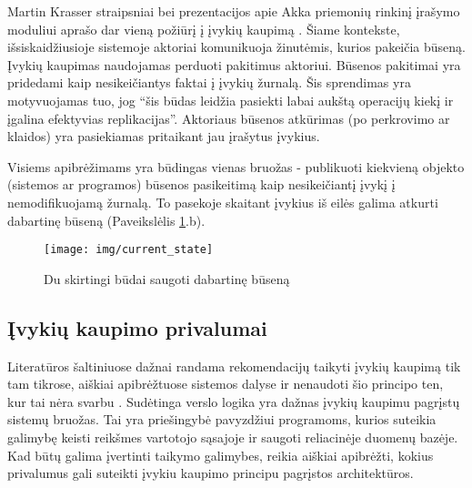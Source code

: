 Martin Krasser straipsniai bei prezentacijos apie Akka priemonių rinkinį įrašymo moduliui aprašo dar vieną požiūrį į įvykių kaupimą \cite{Krasser:AkkaPersistence, Krasser:AkkaYoutube}. Šiame kontekste, išsiskaidžiusioje sistemoje aktoriai komunikuoja žinutėmis, kurios pakeičia būseną. Įvykių kaupimas naudojamas perduoti pakitimus aktoriui. Būsenos pakitimai yra pridedami kaip nesikeičiantys faktai į įvykių žurnalą. Šis sprendimas yra motyvuojamas tuo, jog “šis būdas leidžia pasiekti labai aukštą operacijų kiekį ir įgalina efektyvias replikacijas”. Aktoriaus būsenos atkūrimas (po perkrovimo ar klaidos) yra pasiekiamas pritaikant jau įrašytus įvykius.

Visiems apibrėžimams yra būdingas vienas bruožas - publikuoti kiekvieną objekto (sistemos ar programos) būsenos pasikeitimą kaip nesikeičiantį įvykį į nemodifikuojamą žurnalą. To pasekoje skaitant įvykius iš eilės galima atkurti dabartinę būseną (Paveikslėlis \ref{img:current_state}.b).

\begin{figure}[H]
    \centering
    \texttt{[image: img/current\_state]}
    \caption{Du skirtingi būdai saugoti dabartinę būseną}
    \label{img:current_state}
\end{figure}

\subsection{Įvykių kaupimo privalumai}

Literatūros šaltiniuose dažnai randama rekomendacijų taikyti įvykių kaupimą tik tam tikrose, aiškiai apibrėžtuose sistemos dalyse ir nenaudoti šio principo ten, kur tai nėra svarbu \cite{Betts:2013:ECE:2509680}. Sudėtinga verslo logika yra dažnas įvykių kaupimu pagrįstų sistemų bruožas. Tai yra priešingybė pavyzdžiui programoms, kurios suteikia galimybę keisti reikšmes vartotojo sąsajoje ir saugoti reliacinėje duomenų bazėje. Kad būtų galima įvertinti taikymo galimybes, reikia aiškiai apibrėžti, kokius privalumus gali suteikti įvykiu kaupimo principu pagrįstos architektūros.

